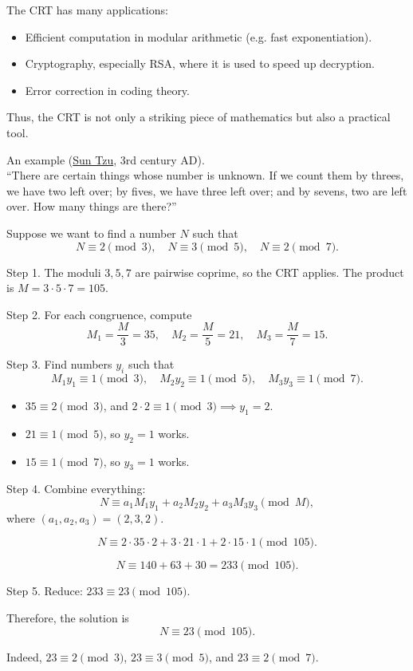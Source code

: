 \medskip
\noindent
The CRT has many applications:
\begin{itemize}
\item Efficient computation in modular arithmetic (e.g. fast exponentiation).
\item Cryptography, especially RSA, where it is used to speed up decryption.
\item Error correction in coding theory.
\end{itemize}
Thus, the CRT is not only a striking piece of mathematics but also a practical tool.

\begin{example}{An example (\href{https://en.wikipedia.org/wiki/Sunzi_Suanjing}{Sun Tzu}, 3rd century AD).} \\

 ``There are certain things whose number is unknown. If we count them by threes, we have two left over; by fives, we have three left over; and by sevens, two are left over. How many things are there?” 


Suppose we want to find a number $N$ such that
\[
N \equiv 2 \pmod{3}, \quad 
N \equiv 3 \pmod{5}, \quad 
N \equiv 2 \pmod{7}.
\]

\noindent
Step 1. The moduli $3,5,7$ are pairwise coprime, so the CRT applies.  
The product is $M = 3 \cdot 5 \cdot 7 = 105$.

\smallskip
\noindent
Step 2. For each congruence, compute
\[
M_1 = \frac{M}{3} = 35, \quad 
M_2 = \frac{M}{5} = 21, \quad 
M_3 = \frac{M}{7} = 15.
\]

\smallskip
\noindent
Step 3. Find numbers $y_i$ such that
\[
M_1 y_1 \equiv 1 \pmod{3}, \quad 
M_2 y_2 \equiv 1 \pmod{5}, \quad 
M_3 y_3 \equiv 1 \pmod{7}.
\]

\begin{itemize}
\item $35 \equiv 2 \pmod{3}$, and $2\cdot 2 \equiv 1 \pmod{3} \implies y_1=2$.
\item $21 \equiv 1 \pmod{5}$, so $y_2=1$ works.
\item $15 \equiv 1 \pmod{7}$, so $y_3=1$ works.
\end{itemize}

\smallskip
\noindent
Step 4. Combine everything:
\[
N \equiv a_1 M_1 y_1 + a_2 M_2 y_2 + a_3 M_3 y_3 \pmod{M},
\]
where $(a_1,a_2,a_3)=(2,3,2)$.

\[
N \equiv 2 \cdot 35 \cdot 2 + 3 \cdot 21 \cdot 1 + 2 \cdot 15 \cdot 1 \pmod{105}.
\]

\[
N \equiv 140 + 63 + 30 = 233 \pmod{105}.
\]

\noindent
Step 5. Reduce: $233 \equiv 23 \pmod{105}$.

\medskip
\noindent
Therefore, the solution is 
\[
N \equiv 23 \pmod{105}.
\]

\smallskip
\noindent
Indeed, $23 \equiv 2 \pmod{3}$, $23 \equiv 3 \pmod{5}$, and $23 \equiv 2 \pmod{7}$.
\end{example}

